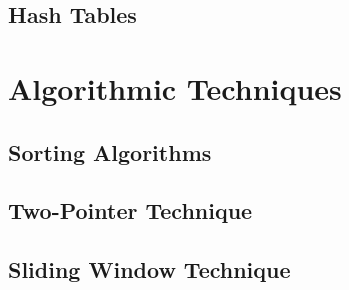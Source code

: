 




\chapter{Hash Tables}


















 \part{Algorithmic Techniques}

\chapter{Sorting Algorithms}






\chapter{Two-Pointer Technique}








\chapter{Sliding Window Technique}









